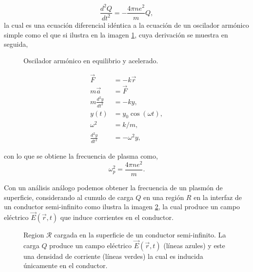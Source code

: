\documentclass[12pt]{article}
\begin{document}
\begin{equation}
  \label{ChargeDifEq}
  \frac{d^{2}Q}{dt^{2}}=-\frac{4\pi n e^{2}}{m}Q,
\end{equation}
la cual es una ecuación diferencial idéntica a la ecuación de un
oscilador armónico simple como el que si ilustra en la
imagen \ref{OscArmonicoSimple}, cuya derivación se muestra en seguida,
\begin{multicols}{2}
  \begin{figure}
    
    \label{OscArmonicoSimple}
    \caption{Oscilador armónico en equilibrio y acelerado.}
  \end{figure}
  \begin{equation}
    \begin{split}
      \vec{F} &= -k\vec{r} \\
      m\vec{a}&=\vec{F} \\
      m\frac{d^{2}y}{dt^{2}}&=-ky,\\
      y(t)&=y_{0}\cos(\omega t),\\
      \omega^{2} &= k/m,\\
      \frac{d^{2}y}{dt^{2}}&=-\omega^{2} y,
      \label{OAEq}
    \end{split}
  \end{equation} 

\end{multicols}

con lo que se obtiene la frecuencia de plasma como,
\begin{equation}
  \label{plasmafec}
  \omega _{p}^{2} = \frac{4\pi ne^{2}}{m}.
\end{equation}

Con un análisis análogo podemos obtener la frecuencia de un plasmón de
superficie, considerando al cumulo de carga $Q$ en una región $R$ en
la interfaz de un conductor semi-infinito como ilustra la imagen
\ref{Surfplasmon}, la cual produce un campo eléctrico $\vec{E}(\vec{r},t)$
que induce corrientes en el conductor.
\begin{figure}
  \centering
  
  \caption{Region $\mathcal{R}$ cargada en la superficie de un conductor
  semi-infinito. La carga $Q$ produce un campo eléctrico
  $\vec{E}(\vec{r},t)$ (líneas azules) y este una densidad de
  corriente (líneas verdes) la cual es inducida únicamente en el
  conductor.}
\label{Surfplasmon}
\end{figure}
\end{document}
